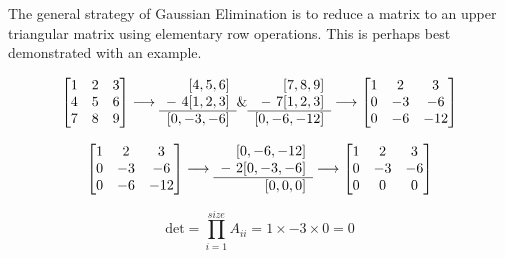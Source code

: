 \documentclass[12pt, titlepage]{article}
\begin{document}
The general strategy of Gaussian Elimination is to reduce a matrix to an upper triangular matrix using elementary row operations. This is perhaps best demonstrated with an example.

\[
\begin{bmatrix}
    1 & 2 & 3 \\
    4 & 5 & 6  \\
    7 & 8 & 9 
\end{bmatrix}
\longrightarrow
\begin{array}[]{r}
     [4, 5, 6]  \\
- \ 4[1, 2, 3] \\ \hline
    [0, -3, -6]
\end{array}
\&
\begin{array}[]{r}
     [7, 8, 9]  \\
- \ 7[1, 2, 3] \\ \hline
    [0, -6, -12]
\end{array}
\longrightarrow
\begin{bmatrix}
    1 & 2 & 3 \\
    0 & -3 & -6  \\
    0 & -6 & -12 
\end{bmatrix}
\]

\[
\begin{bmatrix}
    1 & 2 & 3 \\
    0 & -3 & -6  \\
    0 & -6 & -12 
\end{bmatrix}
\longrightarrow
\begin{array}[]{r}
     [0, -6, -12]  \\
- \ 2[0, -3, -6] \\ \hline
    [0, 0, 0]
\end{array}
\longrightarrow
\begin{bmatrix}
    1 & 2 & 3 \\
    0 & -3 & -6  \\
    0 & 0 & 0 
\end{bmatrix}
\]

\[
\text{det} = \prod_{i=1}^{size} A_{ii} = 1 \times -3 \times 0 = 0
\]
\end{document}
